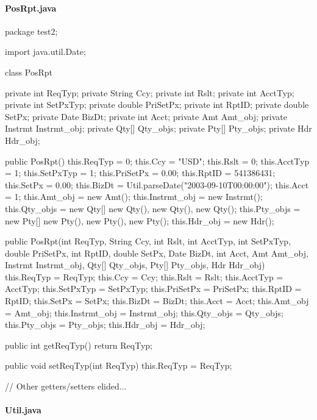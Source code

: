 \documentclass[submission]{eptcs}
\begin{document}
\paragraph{PosRpt.java}
\begin{javacode}
package test2;

import java.util.Date;

class PosRpt {
    private int ReqTyp;
    private String Ccy;
    private int Rslt;
    private int AcctTyp;
    private int SetPxTyp;
    private double PriSetPx;
    private int RptID;
    private double SetPx;
    private Date BizDt;
    private int Acct;
    private Amt Amt_obj;
    private Instrmt Instrmt_obj;
    private Qty[] Qty_objs;
    private Pty[] Pty_objs;
    private Hdr Hdr_obj;

    public PosRpt() {
        this.ReqTyp = 0;
        this.Ccy = "USD";
        this.Rslt = 0;
        this.AcctTyp = 1;
        this.SetPxTyp = 1;
        this.PriSetPx = 0.00;
        this.RptID = 541386431;
        this.SetPx = 0.00;
        this.BizDt = Util.parseDate("2003-09-10T00:00:00");
        this.Acct = 1;
        this.Amt_obj = new Amt();
        this.Instrmt_obj = new Instrmt();
        this.Qty_objs = new Qty[] {new Qty(), new Qty(), new Qty()};
        this.Pty_objs = new Pty[] {new Pty(), new Pty(), new Pty()};
        this.Hdr_obj = new Hdr();
    }

    public PosRpt(int ReqTyp, String Ccy, int Rslt, int AcctTyp, int SetPxTyp, double PriSetPx, int RptID,
                  double SetPx, Date BizDt, int Acct, Amt Amt_obj, Instrmt Instrmt_obj, Qty[] Qty_objs,
                  Pty[] Pty_objs, Hdr Hdr_obj) {
        this.ReqTyp = ReqTyp;
        this.Ccy = Ccy;
        this.Rslt = Rslt;
        this.AcctTyp = AcctTyp;
        this.SetPxTyp = SetPxTyp;
        this.PriSetPx = PriSetPx;
        this.RptID = RptID;
        this.SetPx = SetPx;
        this.BizDt = BizDt;
        this.Acct = Acct;
        this.Amt_obj = Amt_obj;
        this.Instrmt_obj = Instrmt_obj;
        this.Qty_objs = Qty_objs;
        this.Pty_objs = Pty_objs;
        this.Hdr_obj = Hdr_obj;
    }

    public int getReqTyp() {
        return ReqTyp;
    }

    public void setReqTyp(int ReqTyp) {
        this.ReqTyp = ReqTyp;
    }

    // Other getters/setters elided...
}
\end{javacode}

\paragraph{Util.java}
\end{document}

